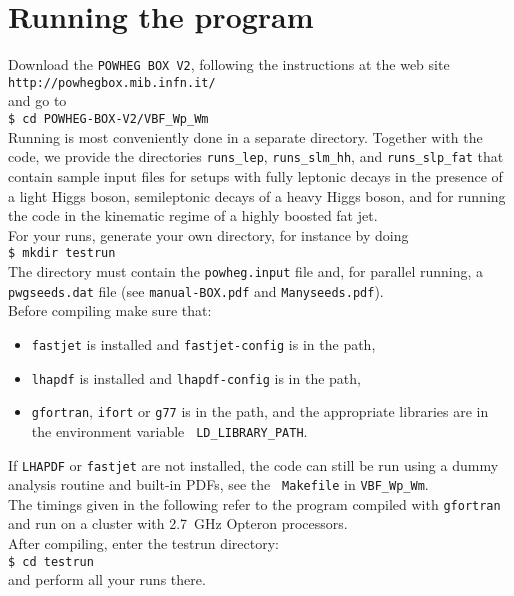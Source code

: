 \documentclass[a4paper,11pt]{article}
\begin{document}
\section*{Running the program}
%
Download the {\tt POWHEG BOX V2}, following the instructions at the web site 
\\[2ex]
{\tt http://powhegbox.mib.infn.it/}
\\[2ex] 
and go to 
\\[2ex]
{\tt \$ cd POWHEG-BOX-V2/VBF\_Wp\_Wm}
\\[2ex]
Running is most conveniently done in a separate directory. Together with the code, we provide the directories {\tt runs\_lep}, {\tt runs\_slm\_hh}, and {\tt runs\_slp\_fat} that contain sample input files for setups with fully leptonic decays in the presence of a light Higgs boson, semileptonic decays of a heavy Higgs boson, and for running the code in the kinematic regime of a highly boosted fat jet. 
\\[2ex]
For your runs, generate your own directory, for instance by doing 
\\[2ex]
{\tt \$ mkdir testrun}
\\[2ex]
The directory must contain the {\tt powheg.input} file and, for
parallel running, a {\tt pwgseeds.dat} file (see {\tt manual-BOX.pdf}
and {\tt Manyseeds.pdf}).
\\[2ex]
Before compiling make sure that:
\begin{itemize}
\item 
{\tt fastjet} is installed and {\tt fastjet-config} is in the path,
\item 
{\tt lhapdf} is installed and {\tt lhapdf-config} is in the path,
\item
{\tt gfortran}, {\tt ifort} or {\tt g77} is in the path, and the
appropriate libraries are in the environment variable {\tt
  LD\_LIBRARY\_PATH}. 
\end{itemize}
%
If {\tt LHAPDF} or {\tt fastjet} are not installed, the code can still
be run using a dummy analysis routine and built-in PDFs, see the {\tt
  Makefile} in {\tt VBF\_Wp\_Wm}.
%
\\[2ex]
The timings given in the following refer to the program compiled with
{\tt gfortran} and run on a cluster with 2.7~GHz Opteron processors.
\\[2ex]
After compiling, enter the testrun directory:
\\[2ex]
{\tt \$ cd testrun}
\\[2ex]
and perform all your runs there. 
\\[2ex]
\end{document}

